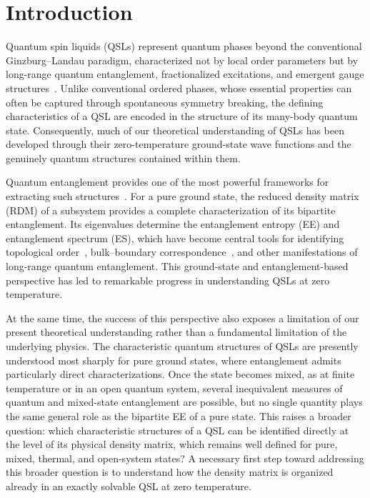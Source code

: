 \section{Introduction}
{ 
Quantum spin liquids (QSLs) represent quantum phases beyond the conventional Ginzburg--Landau paradigm, characterized not by local order parameters but by long-range quantum entanglement, fractionalized excitations, and emergent gauge structures~\cite{Savary-Balent_2017,Zhou-Kanoda-Ng_2017}. Unlike conventional ordered phases, whose essential properties can often be captured through spontaneous symmetry breaking, the defining characteristics of a QSL are encoded in the structure of its many-body quantum state. Consequently, much of our theoretical understanding of QSLs has been developed through their zero-temperature ground-state wave functions and the genuinely quantum structures contained within them.

Quantum entanglement provides one of the most powerful frameworks for extracting such structures~\cite{ZengChenZhouWen2019,Wen_2017,Laflorencie_2016,Amico-Fazio-Osterloh-Vedral_2008,Eisert-Cramer-Plenio_2010,Lyu-Chandorkar-Kapoor-Takei-Sorensen-Witczak-Krempa_2026}. For a pure ground state, the reduced density matrix (RDM) of a subsystem provides a complete characterization of its bipartite entanglement. Its eigenvalues determine the entanglement entropy (EE) and entanglement spectrum (ES), which have become central tools for identifying topological order~\cite{Levin-Wen_2006,Kitaev-Preskill_2006}, bulk--boundary correspondence~\cite{Li-Haldane,Li-Haldane-1,Li-Haldane-2}, and other manifestations of long-range quantum entanglement. This ground-state and entanglement-based perspective has led to remarkable progress in understanding QSLs at zero temperature.

At the same time, the success of this perspective also exposes a limitation of our present theoretical understanding rather than a fundamental limitation of the underlying physics. The characteristic quantum structures of QSLs are presently understood most sharply for pure ground states, where entanglement admits particularly direct characterizations. Once the state becomes mixed, as at finite temperature or in an open quantum system, several inequivalent measures of quantum and mixed-state entanglement are possible, but no single quantity plays the same general role as the bipartite EE of a pure state. This raises a broader question: which characteristic structures of a QSL can be identified directly at the level of its physical density matrix, which remains well defined for pure, mixed, thermal, and open-system states? A necessary first step toward addressing this broader question is to understand how the density matrix is organized already in an exactly solvable QSL at zero temperature.

}
